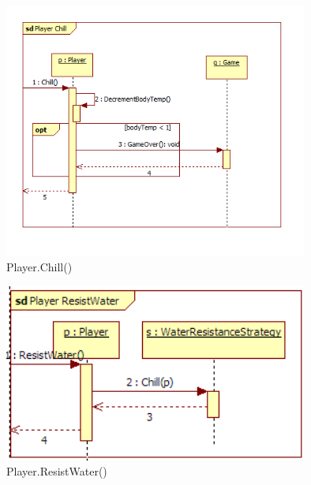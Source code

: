 \begin{figure}[H]
	\begin{center}
		\includegraphics[width=10cm]{chapters/chapter03/seqdiag/Player_Chill.png}
		\caption{Player.Chill()}
		\label{fig:PlayerChill}
	\end{center}
\end{figure}
\begin{figure}[H]
	\begin{center}
		\includegraphics[width=10cm]{chapters/chapter03/seqdiag/Player_ResistWater.png}
		\caption{Player.ResistWater()}
		\label{fig:PlayerResistWater}
	\end{center}
\end{figure}

